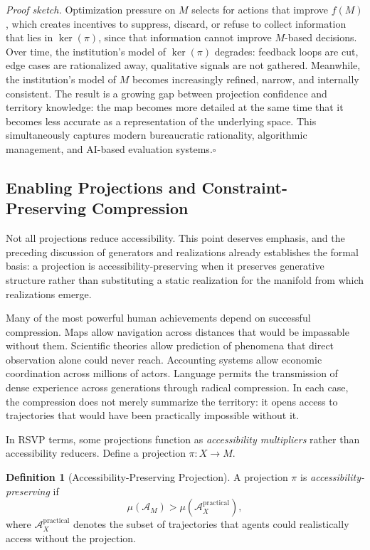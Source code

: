 \documentclass[12pt, a4paper]{article}
\theoremstyle{plain}
\theoremstyle{definition}
\newtheorem{definition}{Definition}
\theoremstyle{remark}
\begin{document}
\textit{Proof sketch.}
Optimization pressure on $M$ selects for actions that improve $f(M)$, which creates
incentives to suppress, discard, or refuse to collect information that lies in $\ker(\pi)$,
since that information cannot improve $M$-based decisions.
Over time, the institution's model of $\ker(\pi)$ degrades: feedback loops are cut,
edge cases are rationalized away, qualitative signals are not gathered.
Meanwhile, the institution's model of $M$ becomes increasingly refined, narrow, and
internally consistent.
The result is a growing gap between projection confidence and territory knowledge:
the map becomes more detailed at the same time that it becomes less accurate
as a representation of the underlying space.
This simultaneously captures modern bureaucratic rationality, algorithmic management,
and AI-based evaluation systems.\hfill$\square$

\subsection{Enabling Projections and Constraint-Preserving Compression}

Not all projections reduce accessibility.
This point deserves emphasis, and the preceding discussion of generators and
realizations already establishes the formal basis: a projection is
accessibility-preserving when it preserves generative structure rather than
substituting a static realization for the manifold from which realizations emerge.

Many of the most powerful human achievements depend on successful compression.
Maps allow navigation across distances that would be impassable without them.
Scientific theories allow prediction of phenomena that direct observation alone
could never reach.
Accounting systems allow economic coordination across millions of actors.
Language permits the transmission of dense experience across generations through
radical compression.
In each case, the compression does not merely summarize the territory: it opens
access to trajectories that would have been practically impossible without it.

In RSVP terms, some projections function as \emph{accessibility multipliers} rather
than accessibility reducers.
Define a projection $\pi : X \to M$.

\begin{definition}[Accessibility-Preserving Projection]
A projection $\pi$ is \emph{accessibility-preserving} if
\[
\mu(\mathcal{A}_M) > \mu(\mathcal{A}_X^{\mathrm{practical}}),
\]
where $\mathcal{A}_X^{\mathrm{practical}}$ denotes the subset of trajectories that
agents could realistically access without the projection.
\end{definition}
\end{document}
